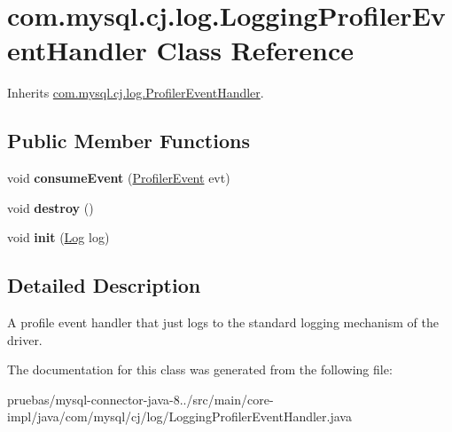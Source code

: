 \hypertarget{classcom_1_1mysql_1_1cj_1_1log_1_1_logging_profiler_event_handler}{}\section{com.\+mysql.\+cj.\+log.\+Logging\+Profiler\+Event\+Handler Class Reference}
\label{classcom_1_1mysql_1_1cj_1_1log_1_1_logging_profiler_event_handler}


Inherits \mbox{\hyperlink{interfacecom_1_1mysql_1_1cj_1_1log_1_1_profiler_event_handler}{com.\+mysql.\+cj.\+log.\+Profiler\+Event\+Handler}}.

\subsection*{Public Member Functions}
\begin{DoxyCompactItemize}
\item 
\mbox{\label{classcom_1_1mysql_1_1cj_1_1log_1_1_logging_profiler_event_handler_a62d6f1a7cdda2e47de6200d255eb5f10}} 
void {\bfseries consume\+Event} (\mbox{\hyperlink{interfacecom_1_1mysql_1_1cj_1_1log_1_1_profiler_event}{Profiler\+Event}} evt)
\item 
\mbox{\label{classcom_1_1mysql_1_1cj_1_1log_1_1_logging_profiler_event_handler_aa1f3a232cf25ed493e6b399ba06a981c}} 
void {\bfseries destroy} ()
\item 
\mbox{\label{classcom_1_1mysql_1_1cj_1_1log_1_1_logging_profiler_event_handler_a3940fb93810bc25e656b2080b7346b84}} 
void {\bfseries init} (\mbox{\hyperlink{interfacecom_1_1mysql_1_1cj_1_1log_1_1_log}{Log}} log)
\end{DoxyCompactItemize}


\subsection{Detailed Description}
A profile event handler that just logs to the standard logging mechanism of the driver. 

The documentation for this class was generated from the following file\+:\begin{DoxyCompactItemize}
\item 
pruebas/mysql-\/connector-\/java-\/8../src/main/core-\/impl/java/com/mysql/cj/log/Logging\+Profiler\+Event\+Handler.\+java\end{DoxyCompactItemize}
